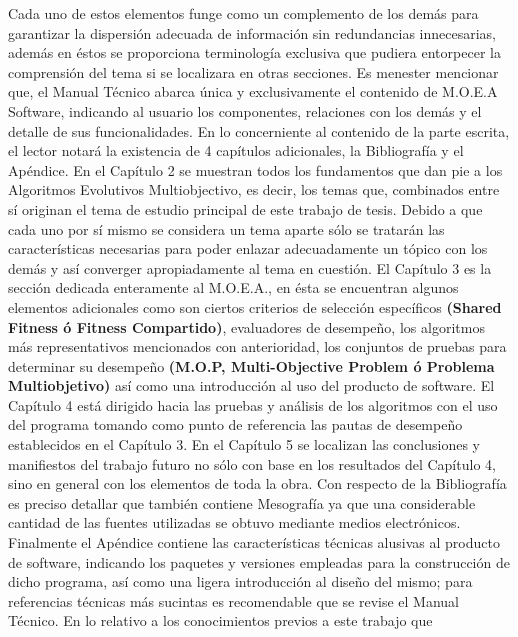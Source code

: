 \documentclass[class=report, crop=false]{standalone}
\begin{document}
Cada uno de estos elementos funge como un complemento de los 
demás para garantizar la dispersión adecuada de información 
sin redundancias innecesarias, además en éstos se proporciona 
terminología exclusiva que pudiera entorpecer la comprensión 
del tema si se localizara en otras secciones.\medskip\break
Es menester mencionar que, el Manual Técnico abarca única 
y exclusivamente el contenido de M.O.E.A Software, indicando 
al usuario los componentes, relaciones con los demás y el 
detalle de sus funcionalidades.\medskip\break
En lo concerniente al contenido de la parte escrita, el lector 
notará la existencia de 4 capítulos adicionales, la Bibliografía 
y el Apéndice.\break
En el Capítulo 2 se muestran todos los fundamentos que dan pie 
a los Algoritmos Evolutivos Multiobjectivo, es decir, los temas 
que, combinados entre sí originan el tema de estudio principal 
de este trabajo de tesis.\break
Debido a que cada uno por sí mismo se considera un tema aparte 
sólo se tratarán las características necesarias para poder 
enlazar adecuadamente un tópico con los demás y así converger 
apropiadamente al tema en cuestión.\medskip\break
El Capítulo 3 es la sección dedicada enteramente al M.O.E.A., 
en ésta se encuentran algunos elementos adicionales como 
son ciertos criterios de selección específicos \textbf{(Shared Fitness ó Fitness Compartido)}, 
evaluadores de desempeño, los algoritmos más representativos 
mencionados con anterioridad, los conjuntos de pruebas 
para determinar su desempeño \textbf{(M.O.P, Multi-Objective Problem ó Problema Multiobjetivo)}
así como una introducción al uso del producto de software.\medskip\break
El Capítulo 4 está dirigido hacia las pruebas y análisis de 
los algoritmos con el uso del programa tomando como punto de 
referencia las pautas de desempeño establecidos en el Capítulo 3.\medskip\break
En el Capítulo 5 se localizan las conclusiones y manifiestos 
del trabajo futuro no sólo con base en los resultados del 
Capítulo 4, sino en general con los elementos de toda la obra.\medskip\break
Con respecto de la Bibliografía es preciso detallar que también 
contiene Mesografía ya que una considerable cantidad de las 
fuentes utilizadas se obtuvo mediante medios electrónicos.\medskip\break
Finalmente el Apéndice contiene las características técnicas 
alusivas al producto de software, indicando los paquetes y 
versiones empleadas para la construcción de dicho programa, 
así como una ligera introducción al diseño del mismo; para 
referencias técnicas más sucintas es recomendable que se 
revise el Manual Técnico.\medskip\break
En lo relativo a los conocimientos previos a este trabajo que 
\end{document}
